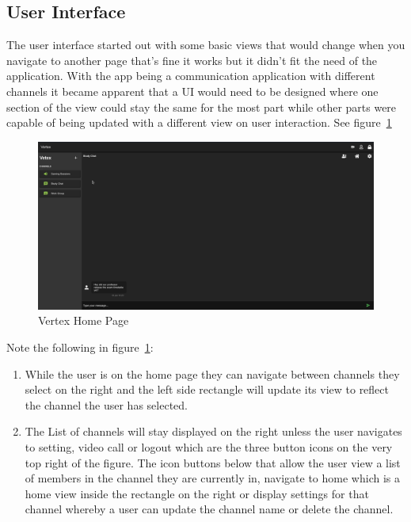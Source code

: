 \subsection{User Interface}
\label{UI}
The user interface started out with some basic views that would change when you navigate to another page that's fine it works but it didn't fit the need of the application. With the app being a communication application with different channels it became apparent that a UI would need to be designed where one section of the view could stay the same for the most part while other parts were capable of being updated with a different view on user interaction. See figure~\ref{image:vertexHomePage} 
\begin{figure}[h!]
    \caption{Vertex Home Page}
    \label{image:vertexHomePage}
    \centering
    \includegraphics[width=1.0\textwidth]{images/vertex_homehome_view.png}
\end{figure}

Note the following in figure~\ref{image:vertexHomePage}:
\begin{enumerate}
    \item While the user is on the home page they can navigate between channels they select on the right and the left side rectangle will update its view to reflect the channel the user has selected.
    \item The List of channels will stay displayed on the right unless the user navigates to setting, video call or logout which are the three button icons on the very top right of the figure. The icon buttons below that allow the user view a list of members in the channel they are currently in, navigate to home which is a home view inside the rectangle on the right or display settings for that channel whereby a user can update the channel name or delete the channel. 
\end{enumerate}

